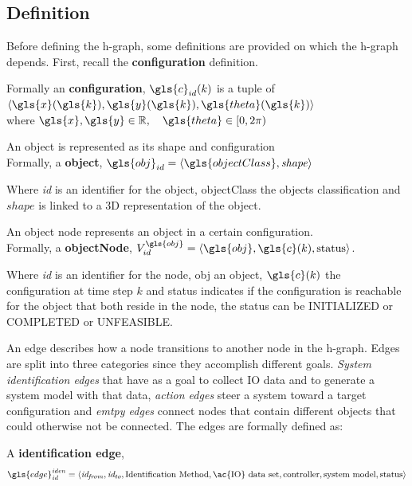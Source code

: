 \subsection{Definition}%
\label{subsec:h-graph_definition}%
Before defining the \ac{h-graph}, some definitions are provided on which the \ac{h-graph} depends. First, recall the \textbf{configuration} definition.\bs

Formally an \textbf{configuration}, $\gls{c}_{id}(k)$ is a tuple of $\left\langle \gls{x}(\gls{k}), \gls{y}(\gls{k}), \gls{theta}(\gls{k})\right\rangle$\\ where $\gls{x}, \gls{y} \in \mathbb{R}, \quad  \gls{theta} \in [0, 2\pi)$\bs

An object is represented as its shape and configuration\\Formally, a \textbf{object},  $\gls{obj}_{id} = \left\langle \gls{objectClass}, \mathit{shape} \right\rangle $\bs

Where \textit{id} is an identifier for the object, \gls{objectClass} the objects classification and $\mathit{shape}$ is linked to a 3D representation of the object.\bs

An object node represents an object in a certain configuration.\\Formally, a \textbf{objectNode}, $V^{\gls{obj}}_{id} =\left\langle \gls{obj}, \gls{c}(k), \textrm{status} \right\rangle $.\bs

Where \textit{id} is an identifier for the node, \gls{obj} an object, $\gls{c}(k)$ the configuration at time step $k$ and status indicates if the configuration is reachable for the object that both reside in the node, the status can be INITIALIZED or COMPLETED or UNFEASIBLE.\bs

An edge describes how a node transitions to another node in the \ac{h-graph}. Edges are split into three categories since they accomplish different goals. \textit{System identification edges} that have as a goal to collect \ac{IO} data and to generate a system model with that data, \textit{action edges} steer a system toward a target configuration and \textit{emtpy edges} connect nodes that contain different objects that could otherwise not be connected. The edges are formally defined as:\bs

A \textbf{identification edge}, \[\gls{edge}^\mathit{iden}_\mathit{id} = \left\langle \mathit{id_{from}}, \mathit{id_{to}}, \textrm{Identification Method}, \textrm{\ac{IO} data set}, \textrm{controller}, \textrm{system model}, \textrm{status} \right\rangle\]\bs

